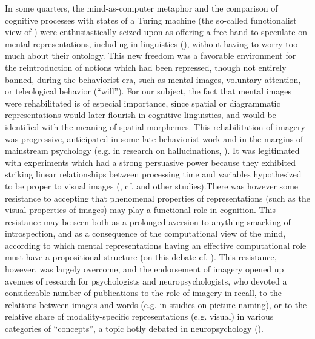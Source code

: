 \documentclass[english,output=paper,colorlinks,citecolor=brown]{../langscibook}
\begin{document}
In some quarters, the mind-as-computer metaphor and the comparison of cognitive processes with states of a Turing machine (the so-called functionalist view of \citealt{Putnam1960}) were enthusiastically seized upon as offering a free hand to speculate on mental representations, including in linguistics (\citealt{Katz1964}), without having to worry too much about their ontology. This new freedom was a favorable environment for the reintroduction of notions which had been repressed, though not entirely banned, during the behaviorist era, such as mental images, voluntary attention, or teleological behavior (“will”). For our subject, the fact that mental images were rehabilitated is of especial importance, since spatial or diagrammatic representations would later flourish in cognitive linguistics, and would be identified with the meaning of spatial morphemes. This rehabilitation of imagery was progressive, anticipated in some late behaviorist work \citep[281ff]{Mowrer1960} and in the margins of mainstream psychology (e.g. in research on hallucinations, \citealt{Holt1964}). It was legitimated with experiments which had a strong persuasive power because they exhibited striking linear relationships between processing time and variables hypothesized to be proper to visual images (\citealt[161]{Baars1986}, cf. \citealt{ShepardMetzler1971} and other studies).There was however some resistance to accepting that phenomenal properties of representations (such as the visual properties of images) may play a functional role in cognition. This resistance may be seen both as a prolonged aversion to anything smacking of introspection, and as a consequence of the computational view of the mind, according to which mental representations having an effective computational role must have a propositional structure (on this debate cf. \citealt{Fortis1994}). This resistance, however, was largely overcome, and the endorsement of imagery opened up avenues of research for psychologists and neuropsychologists, who devoted a considerable number of publications to the role of imagery in recall, to the relations between images and words (e.g. in studies on picture naming), or to the relative share of modality-specific representations (e.g. visual) in various categories of “concepts”, a topic hotly debated in neuropsychology (\citealt{Fortis1997}).
\end{document}
